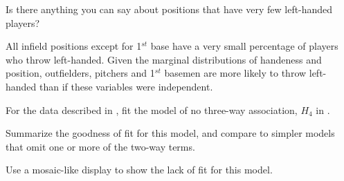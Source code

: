 \documentclass[10pt]{report}\usepackage[]{graphicx}\usepackage[]{color}
\newenvironment{knitrout}{}{} %
\renewenvironment{knitrout}{\small\renewcommand{\baselinestretch}{.85}}{} %
\begin{document}
\begin{Exercises}
\begin{enumerate*}
\begin{ans}
\begin{knitrout}
\end{knitrout}
    \end{ans}
    
    \item Is there anything you can say about positions that have very few left-handed
    players?
    \begin{ans}
    All infield positions except for 1$^{st}$ base have a very small percentage of
    players who throw left-handed. Given the marginal distributions of handeness and
    position, outfielders, pitchers and 1$^{st}$ basemen are more likely to throw
    left-handed than if these variables were independent.
    \end{ans}
    
  \end{enumerate*}


\exercise For the  data described in , fit the model of no three-way
association, $H_4$ in . 
  \begin{enumerate*}
  
  \item Summarize the goodness of fit for this model, and compare to simpler models that
  omit one or more of the two-way terms.
  \begin{ans}
  \end{ans}
  
  
  \item Use a mosaic-like display to show the lack of fit for this model.
  \begin{ans}
  \end{ans}
  
  \end{enumerate*}


\end{Exercises}
\end{document}
